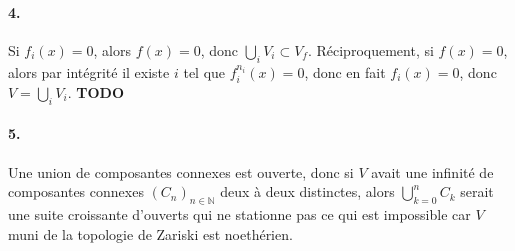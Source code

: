 \documentclass{article}
\newcommand{\N}{\mathbb{N}}
\newcommand{\todo}{\textbf{TODO}}
\begin{document}
\paragraph{4.} Si $f_i(x) = 0$, alors $f(x) = 0$, donc $\bigcup_i V_i \subset V_f$. Réciproquement, si $f(x)=0$, alors par intégrité il existe $i$ tel que $f_i^{n_i}(x) = 0$, donc en fait $f_i(x)=0$, donc $V = \bigcup_i V_i$. \todo

\paragraph{5.} Une union de composantes connexes est ouverte, donc si $V$ avait une infinité de composantes connexes $(C_n)_{n\in \N}$ deux à deux distinctes, alors $\bigcup_{k=0}^n C_k$ serait une suite croissante d'ouverts qui ne stationne pas ce qui est impossible car $V$ muni de la topologie de Zariski est noethérien. 
\end{document}
